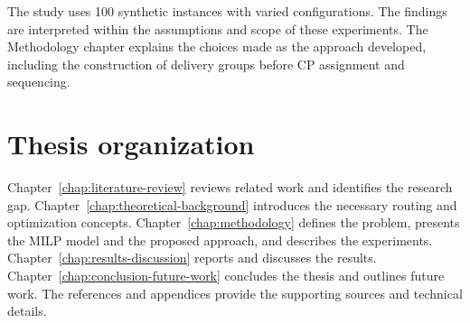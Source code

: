 The study uses 100 synthetic instances with varied configurations. The
findings are interpreted within the assumptions and scope of these
experiments. The Methodology chapter explains the choices made as the
approach developed, including the construction of delivery groups before
CP assignment and sequencing.

\section*{Thesis organization}

Chapter~\ref{chap:literature-review} reviews related work and identifies the
research gap. Chapter~\ref{chap:theoretical-background} introduces the
necessary routing and optimization concepts.
Chapter~\ref{chap:methodology} defines the problem, presents the MILP model
and the proposed approach, and describes the experiments.
Chapter~\ref{chap:results-discussion} reports and discusses the results.
Chapter~\ref{chap:conclusion-future-work} concludes the thesis and outlines
future work. The references and appendices provide the supporting sources
and technical details.
